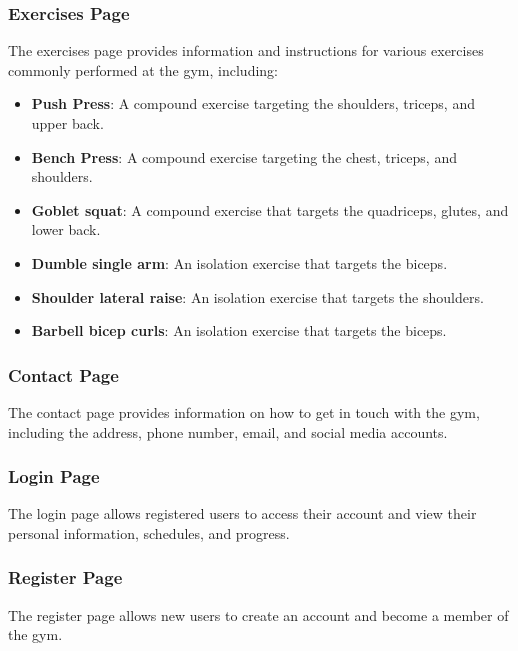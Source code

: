 \documentclass{beamer}
\begin{document}
\begin{frame}
\frametitle{Exercises Page}

The exercises page provides information and instructions for various exercises commonly performed at the gym, including:

\begin{itemize}
\item \textbf{Push Press}: A compound exercise targeting the shoulders, triceps, and upper back.
\item \textbf{Bench Press}: A compound exercise targeting the chest, triceps, and shoulders.
\item \textbf{Goblet squat}: A compound exercise that targets the quadriceps, glutes, and lower back.
\item \textbf{Dumble single arm}: An isolation exercise that targets the biceps.
\item \textbf{Shoulder lateral raise}: An isolation exercise that targets the shoulders.
\item \textbf{Barbell bicep curls}: An isolation exercise that targets the biceps.
\end{itemize}
\end{frame}

\begin{frame}
\frametitle{Contact Page}

The contact page provides information on how to get in touch with the gym, including the address, phone number, email, and social media accounts.
\end{frame}

\begin{frame}
\frametitle{Login Page}

The login page allows registered users to access their account and view their personal information, schedules, and progress.
\end{frame}

\begin{frame}
\frametitle{Register Page}

The register page allows new users to create an account and become a member of the gym.
\end{frame}
\end{document}

